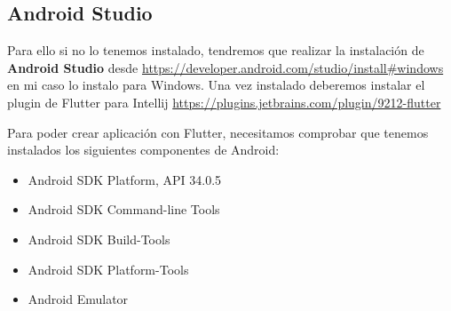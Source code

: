 
\subsection{Android Studio}
Para ello si no lo tenemos instalado, tendremos que realizar la instalación de \textbf{Android Studio} desde \url{https://developer.android.com/studio/install#windows} en mi caso lo instalo para Windows. Una vez instalado deberemos instalar el plugin de Flutter para Intellij \url{https://plugins.jetbrains.com/plugin/9212-flutter}

Para poder crear aplicación con Flutter, necesitamos comprobar que tenemos instalados los siguientes componentes de Android:
\begin{itemize}
	\item Android SDK Platform, API 34.0.5
	\item Android SDK Command-line Tools
	\item Android SDK Build-Tools
	\item Android SDK Platform-Tools
	\item Android Emulator
\end{itemize}


